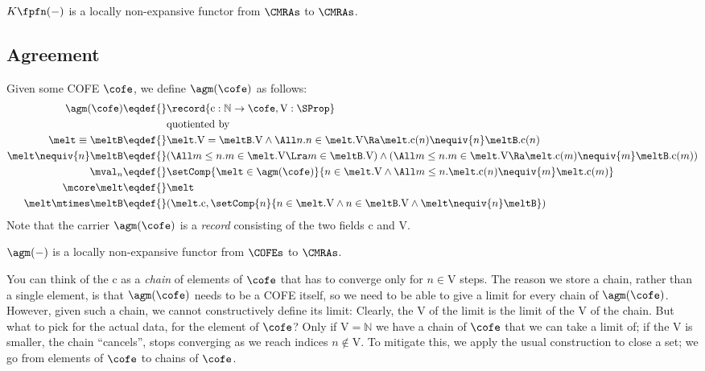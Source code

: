 $K \fpfn (-)$ is a locally non-expansive functor from $\CMRAs$ to $\CMRAs$.

\subsection{Agreement}

Given some COFE $\cofe$, we define $\agm(\cofe)$ as follows:
\newcommand{\aginjc}{\mathrm{c}} %
\newcommand{\aginjV}{\mathrm{V}} %
\begin{align*}
  \agm(\cofe) \eqdef{}& \record{\aginjc : \mathbb{N} \to \cofe , \aginjV : \SProp} \\
  & \text{quotiented by} \\
  \melt \equiv \meltB \eqdef{}& \melt.\aginjV = \meltB.\aginjV \land \All n. n \in \melt.\aginjV \Ra \melt.\aginjc(n) \nequiv{n} \meltB.\aginjc(n) \\
  \melt \nequiv{n} \meltB \eqdef{}& (\All m \leq n. m \in \melt.\aginjV \Lra m \in \meltB.\aginjV) \land (\All m \leq n. m \in \melt.\aginjV \Ra \melt.\aginjc(m) \nequiv{m} \meltB.\aginjc(m)) \\
  \mval_n \eqdef{}& \setComp{\melt \in \agm(\cofe)}{ n \in \melt.\aginjV \land \All m \leq n. \melt.\aginjc(n) \nequiv{m} \melt.\aginjc(m) } \\
  \mcore\melt \eqdef{}& \melt \\
  \melt \mtimes \meltB \eqdef{}& (\melt.\aginjc, \setComp{n}{n \in \melt.\aginjV \land n \in \meltB.\aginjV \land \melt \nequiv{n} \meltB })
\end{align*}
Note that the carrier $\agm(\cofe)$ is a \emph{record} consisting of the two fields $\aginjc$ and $\aginjV$.

$\agm(-)$ is a locally non-expansive functor from $\COFEs$ to $\CMRAs$.

You can think of the $\aginjc$ as a \emph{chain} of elements of $\cofe$ that has to converge only for $n \in \aginjV$ steps.
The reason we store a chain, rather than a single element, is that $\agm(\cofe)$ needs to be a COFE itself, so we need to be able to give a limit for every chain of $\agm(\cofe)$.
However, given such a chain, we cannot constructively define its limit: Clearly, the $\aginjV$ of the limit is the limit of the $\aginjV$ of the chain.
But what to pick for the actual data, for the element of $\cofe$?
Only if $\aginjV = \mathbb{N}$ we have a chain of $\cofe$ that we can take a limit of; if the $\aginjV$ is smaller, the chain ``cancels'', \ie stops converging as we reach indices $n \notin \aginjV$.
To mitigate this, we apply the usual construction to close a set; we go from elements of $\cofe$ to chains of $\cofe$.

